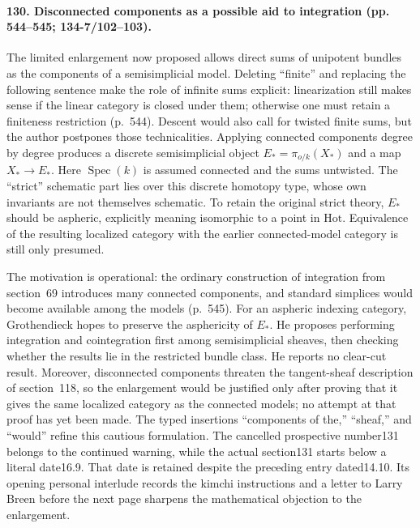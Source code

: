 \paragraph{130. Disconnected components as a possible aid to integration (pp. 544--545; 134-7/102--103).}
The limited enlargement now proposed allows direct sums of unipotent bundles as the components of a semisimplicial model. Deleting ``finite'' and replacing the following sentence make the role of infinite sums explicit: linearization still makes sense if the linear category is closed under them; otherwise one must retain a finiteness restriction (p.~544). Descent would also call for twisted finite sums, but the author postpones those technicalities. Applying connected components degree by degree produces a discrete semisimplicial object $E_* = \pi_{o/k}(X_*)$ and a map $X_*\to E_*$. Here $\operatorname{Spec}(k)$ is assumed connected and the sums untwisted. The ``strict'' schematic part lies over this discrete homotopy type, whose own invariants are not themselves schematic. To retain the original strict theory, $E_*$ should be aspheric, explicitly meaning isomorphic to a point in $\mathrm{Hot}$. Equivalence of the resulting localized category with the earlier connected-model category is still only presumed.

The motivation is operational: the ordinary construction of integration from section~69 introduces many connected components, and standard simplices would become available among the models (p.~545). For an aspheric indexing category, Grothendieck hopes to preserve the asphericity of $E_*$. He proposes performing integration and cointegration first among semisimplicial sheaves, then checking whether the results lie in the restricted bundle class. He reports no clear-cut result. Moreover, disconnected components threaten the tangent-sheaf description of section~118, so the enlargement would be justified only after proving that it gives the same localized category as the connected models; no attempt at that proof has yet been made. The typed insertions ``components of the,'' ``sheaf,'' and ``would'' refine this cautious formulation. The cancelled prospective number131 belongs to the continued warning, while the actual section131 starts below a literal date16.9. That date is retained despite the preceding entry dated14.10. Its opening personal interlude records the kimchi instructions and a letter to Larry Breen before the next page sharpens the mathematical objection to the enlargement.

